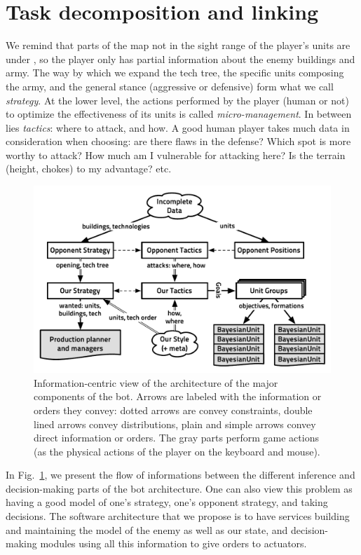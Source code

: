 \section{Task decomposition and linking}
We remind that parts of the map not in the sight range of the player's units are under \textit{}, so the player only has partial information about the enemy buildings and army. The way by which we expand the tech tree, the specific units composing the army, and the general stance (aggressive or defensive) form what we call \textit{strategy}. At the lower level, the actions performed by the player (human or not) to optimize the effectiveness of its units is called \textit{micro-management}. In between lies \textit{tactics}: where to attack, and how. A good human player takes much data in consideration when choosing: are there flaws in the defense? Which spot is more worthy to attack? How much am I vulnerable for attacking here? Is the terrain (height, chokes) to my advantage? etc.
\begin{figure}[!ht]
\begin{center}
\includegraphics[width=13cm]{images/starcraft_bbq_concept.pdf}
\end{center}
\label{fig:conceptbbq}
\caption{Information-centric view of the architecture of the major components of the bot. Arrows are labeled with the information or orders they convey: dotted arrows are convey constraints, double lined arrows convey distributions, plain and simple arrows convey direct information or orders. The gray parts perform game actions (as the physical actions of the player on the keyboard and mouse).}
\end{figure}

In Fig.~\ref{fig:conceptbbq}, we present the flow of informations between the different inference and decision-making parts of the bot architecture. One can also view this problem as having a good model of one's strategy, one's opponent strategy, and taking decisions. The software architecture that we propose is to have services building and maintaining the model of the enemy as well as our state, and decision-making modules using all this information to give orders to actuators.


